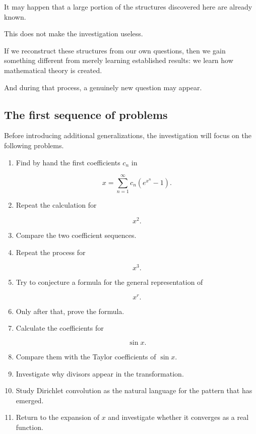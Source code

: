 It may happen that a large portion of the structures discovered here are
already known.

This does not make the investigation useless.

If we reconstruct these structures from our own questions, then we gain
something different from merely learning established results: we learn how
mathematical theory is created.

And during that process, a genuinely new question may appear.

\subsection{The first sequence of problems}

Before introducing additional generalizations, the investigation will focus
on the following problems.

\begin{enumerate}

    \item Find by hand the first coefficients \(c_n\) in

    \[
    x
    =
    \sum_{n=1}^{\infty}
    c_n(e^{x^n}-1).
    \]

    \item Repeat the calculation for

    \[
    x^2.
    \]

    \item Compare the two coefficient sequences.

    \item Repeat the process for

    \[
    x^3.
    \]

    \item Try to conjecture a formula for the general representation of

    \[
    x^r.
    \]

    \item Only after that, prove the formula.

    \item Calculate the coefficients for

    \[
    \sin x.
    \]

    \item Compare them with the Taylor coefficients of \(\sin x\).

    \item Investigate why divisors appear in the transformation.

    \item Study Dirichlet convolution as the natural language for the
    pattern that has emerged.

    \item Return to the expansion of \(x\) and investigate whether it
    converges as a real function.

\end{enumerate}


